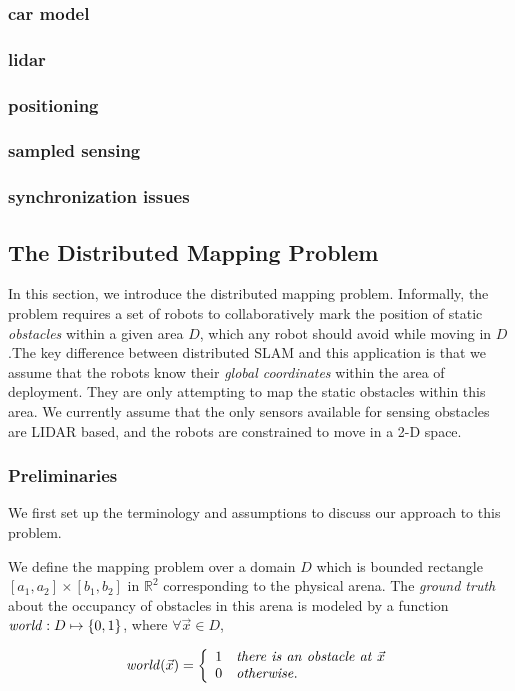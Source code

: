\subsubsection{car model}
\subsubsection{lidar}
\subsubsection{positioning}
\subsubsection{sampled sensing}
\subsubsection{synchronization issues}

\subsection{The Distributed Mapping Problem}
In this section, we introduce the distributed mapping problem. Informally, the problem requires a set of robots to collaboratively mark the position of static \emph{obstacles} within a given area $D$, which any robot should avoid while moving in $D$.The key difference between distributed SLAM and this application is that we assume that the robots know their \emph{global coordinates} within the area of deployment. They are only attempting to map the static obstacles within this area. We currently assume that the only sensors available for sensing obstacles are LIDAR based, and the robots are constrained to move in a 2-D space.


\subsubsection{Preliminaries}
\label{sec:prelims}
We first set up the terminology and assumptions to discuss our approach to this problem.

We define the mapping problem over a domain $D$ which is bounded rectangle $[a_1,a_2]\times [b_1,b_2]$ in $\mathbb{R}^2$ corresponding to the physical arena. 
The \emph{ground truth} about the occupancy of obstacles in this arena is modeled by a function $\mathit{world} : D\mapsto \left\{0,1\right\}$, where $\forall \Vec{x} \in D$, 

\begin{align}
\mathit{world}(\Vec{x}) = 
		\left\{
		\begin{array}{ll}
			1 & \mathit{there \ is\ an\ obstacle\ at}\ \Vec{x}\\
			0 & \mathit{otherwise}.
		\end{array}
		\right.
\end{align}

